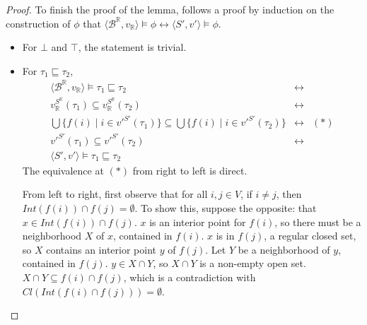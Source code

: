 \documentclass{article}
\newcommand{\R}{\mathbb{R}}
\newcommand{\B}{\mathcal{B}}
\newcommand{\lpart}{\sqsubseteq}
\begin{document}
\begin{proof}
    To finish the proof of the lemma, follows a proof by induction on the construction of $\phi$ that $\langle \B^\R, v_\R \rangle \models \phi \leftrightarrow \langle S', v' \rangle \models \phi$.
    \begin{itemize}
    \item For $\bot$ and $\top$, the statement is trivial.
    \item For $\tau_1 \lpart \tau_2$,
      \begin{align*}
        \langle \B^\R, v_\R \rangle \models \tau_1 \lpart \tau_2 &\leftrightarrow \\
        v_\R^{S^\R}(\tau_1) \subseteq v_\R^{S^\R}(\tau_2) &\leftrightarrow \\
        \bigcup\{f(i) \mid i \in v'^{S'}(\tau_1)\} \subseteq \bigcup\{f(i) \mid i \in v'^{S'}(\tau_2)\} &\leftrightarrow & (*) \\
        v'^{S'}(\tau_1) \subseteq v'^{S'}(\tau_2) &\leftrightarrow \\
        \langle S', v' \rangle \models \tau_1 \lpart \tau_2
      \end{align*}
      The equivalence at $(*)$ from right to left is direct.

      From left to right, first observe that for all $i, j \in V$, if $i \neq j$, then $Int(f(i)) \cap f(j) = \emptyset$. To show this, suppose the opposite: that $x \in Int(f(i)) \cap f(j)$. $x$ is an interior point for $f(i)$, so there must be a neighborhood $X$ of $x$, contained in $f(i)$. $x$ is in $f(j)$, a regular closed set, so $X$ contains an interior point $y$ of $f(j)$. Let $Y$ be a neighborhood of $y$, contained in $f(j)$. $y \in X \cap Y$, so $X \cap Y$ is a non-empty open set. $X \cap Y \subseteq f(i) \cap f(j)$, which is a contradiction with $Cl(Int(f(i) \cap f(j))) = \emptyset$.


\end{itemize}
\end{proof}
\end{document}
